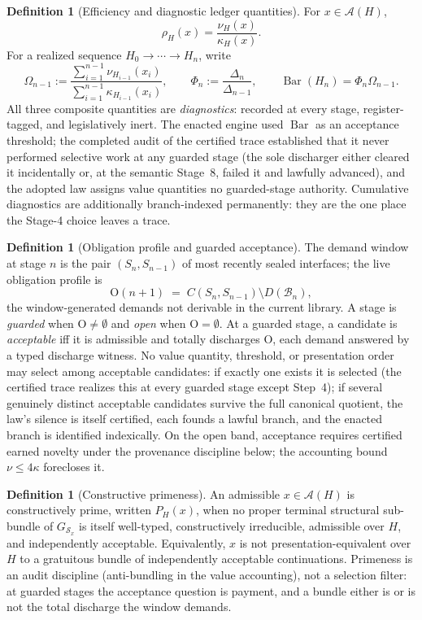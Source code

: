 \documentclass[11pt]{article}
\theoremstyle{plain}
\theoremstyle{definition}
\newtheorem{definition}[theorem]{Definition}
\theoremstyle{remark}
\newcommand{\B}{\mathcal{B}}
\newcommand{\A}{\mathcal{A}}
\newcommand{\SelBar}{\operatorname{Bar}}
\begin{document}
\begin{definition}[Efficiency and diagnostic ledger quantities]
For \(x\in\A(H)\),
\[
\rho_H(x)=\frac{\nu_H(x)}{\kappa_H(x)}.
\]
For a realized sequence \(H_0\to\cdots\to H_n\), write
\[
\Omega_{n-1}:=
\frac{\sum_{i=1}^{n-1}\nu_{H_{i-1}}(x_i)}
{\sum_{i=1}^{n-1}\kappa_{H_{i-1}}(x_i)},
\qquad
\Phi_n:=\frac{\Delta_{n}}{\Delta_{n-1}},
\qquad
\SelBar(H_n)=\Phi_n\Omega_{n-1}.
\]
All three composite quantities are \emph{diagnostics}: recorded at every stage, register-tagged, and legislatively inert. The enacted engine used \(\SelBar\) as an acceptance threshold; the completed audit of the certified trace established that it never performed selective work at any guarded stage (the sole discharger either cleared it incidentally or, at the semantic Stage~8, failed it and lawfully advanced), and the adopted law assigns value quantities no guarded-stage authority. Cumulative diagnostics are additionally branch-indexed permanently: they are the one place the Stage-4 choice leaves a trace.
\end{definition}

\begin{definition}[Obligation profile and guarded acceptance]
The demand window at stage \(n\) is the pair \((S_n,S_{n-1})\) of most recently sealed interfaces; the live obligation profile is
\[
\mathrm{O}(n+1) \;=\; C(S_n,S_{n-1})\setminus D(\B_n),
\]
the window-generated demands not derivable in the current library. A stage is \emph{guarded} when \(\mathrm{O}\neq\emptyset\) and \emph{open} when \(\mathrm{O}=\emptyset\). At a guarded stage, a candidate is \emph{acceptable} iff it is admissible and totally discharges \(\mathrm{O}\), each demand answered by a typed discharge witness. No value quantity, threshold, or presentation order may select among acceptable candidates: if exactly one exists it is selected (the certified trace realizes this at every guarded stage except Step~4); if several genuinely distinct acceptable candidates survive the full canonical quotient, the law's silence is itself certified, each founds a lawful branch, and the enacted branch is identified indexically. On the open band, acceptance requires certified earned novelty under the provenance discipline below; the accounting bound \(\nu\le4\kappa\) forecloses it.
\end{definition}

\begin{definition}[Constructive primeness]
An admissible \(x\in\A(H)\) is constructively prime, written \(P_H(x)\), when no proper terminal structural sub-bundle of \(G_{\mathcal{S}_x}\) is itself well-typed, constructively irreducible, admissible over \(H\), and independently acceptable. Equivalently, \(x\) is not presentation-equivalent over \(H\) to a gratuitous bundle of independently acceptable continuations. Primeness is an audit discipline (anti-bundling in the value accounting), not a selection filter: at guarded stages the acceptance question is payment, and a bundle either is or is not the total discharge the window demands.
\end{definition}
\end{document}
